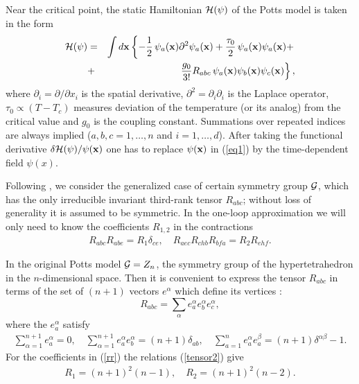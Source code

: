 \documentclass[12pt]{iopart}
\begin{document}
Near the critical point, the static Hamiltonian ${\cal H}(\psi)$ of
the Potts model is taken in the form \cite{Golner,Zia,Priest}
\begin{eqnarray}
{\cal H}(\psi) &=&  \int d{\bf x} \left\{- \frac{1}{2}\,
 \psi_a({\bf x})\partial^{2} \psi_a({\bf x}) + \frac{\tau_{0}}{2}\,
\psi_a({\bf x})\psi_a({\bf x}) + \right.
\nonumber \\
&+& \left. \frac{g_{0}}{3!}R_{abc} \,
\psi_a({\bf x})\psi_b({\bf x})\psi_c({\bf x}) \right\},
\label{LG}
\end{eqnarray}
where $\partial_{i} = \partial/ \partial x_{i}$ is the spatial derivative,
$\partial^{2} = \partial_{i}\partial_{i}$ is the Laplace operator,
$\tau_{0} \propto (T-T_{c})$ measures deviation of the temperature
(or its analog) from the critical value and $g_0$ is the coupling constant.
Summations over repeated indices are always implied
($a,b,c=1,\dots,n$ and $i=1,\dots,d$).
After taking the functional derivative
$\delta {\cal H}(\psi) / \psi({\bf x})$ one has to replace
$\psi({\bf x})$ in (\ref{eq1}) by the time-dependent field $\psi(x)$.

Following \cite{Bonfim}, we consider the generalized case of certain symmetry
group ${\cal G}$, which has the only irreducible invariant third-rank tensor
$R_{abc}$; without loss of generality it is assumed to be symmetric.
In the one-loop approximation we will only need to know the coefficients
$R_{1,2}$ in the contractions
\begin{eqnarray}
R_{abc}R_{abe}=R_1 \delta_{ce}, \quad
R_{aec}R_{chb}R_{b\!f\!a}=R_2 R_{eh\!f}.
\label{rr}
\end{eqnarray}

In the original Potts model ${\cal G}=Z_{n}$, the symmetry group of the
hypertetrahedron in the $n$-dimensional space. Then it is convenient to
express the tensor $R_{abc}$ in terms of the set of $(n+1)$ vectors
$e^{\alpha}$ which define its vertices \cite{Golner,Zia}:
\[ R_{abc}=\sum_{\alpha}e^{\alpha}_ae^{\alpha}_be^{\alpha}_c, \]
where the $e^{\alpha}_a$ satisfy
\begin{eqnarray}
\sum_{\alpha=1}^{n+1}e^{\alpha}_a=0, \quad
\sum_{\alpha=1}^{n+1}e^{\alpha}_ae^{\alpha}_b=(n+1)\delta_{ab}, \quad
\sum_{a=1}^{n} e^{\alpha}_ae^{\beta}_a=(n+1)\delta^{\alpha\beta}-1.
\label{tensor2}
\end{eqnarray}
For the coefficients in (\ref{rr}) the relations (\ref{tensor2}) give
\begin{eqnarray}
R_1=(n+1)^2(n-1), \quad  R_2=(n+1)^2(n-2).
\label{contract}
\end{eqnarray}
\end{document}

